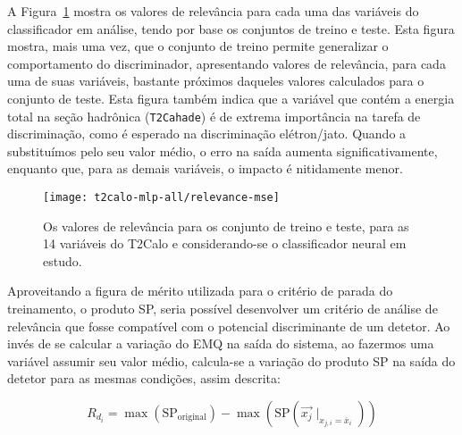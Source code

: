 A Figura~\ref{fig:t2calo-mlp-all-relevance} mostra os valores de relevância
para cada uma das variáveis do classificador em análise, tendo por base os
conjuntos de treino e teste. Esta figura mostra, mais uma vez, que o conjunto
de treino permite generalizar o comportamento do discriminador, apresentando
valores de relevância, para cada uma de suas variáveis, bastante próximos
daqueles valores calculados para o conjunto de teste. Esta figura também
indica que a variável que contém a energia total na seção hadrônica
(\texttt{T2Cahade}) é de extrema importância na tarefa de discriminação, como
é esperado na discriminação elétron/jato. Quando a substituímos pelo seu valor
médio, o erro na saída aumenta significativamente, enquanto que, para as
demais variáveis, o impacto é nitidamente menor.

\begin{figure}
\begin{center}
\texttt{[image: t2calo-mlp-all/relevance-mse]}
\end{center}
\caption{Os valores de relevância para os conjunto de treino e
teste, para as 14 variáveis do T2Calo e considerando-se o classificador neural
em estudo.}
\label{fig:t2calo-mlp-all-relevance}
\end{figure}

Aproveitando a figura de mérito utilizada para o critério de parada do
treinamento, o produto SP, seria possível desenvolver um critério de análise
de relevância que fosse compatível com o potencial discriminante de um
detetor. Ao invés de se calcular a variação do EMQ na saída do sistema, ao
fazermos uma variável assumir seu valor médio, calcula-se a variação do
produto SP na saída do detetor para as mesmas condições, assim descrita:

\begin{equation}
R_{d_i} = \max(\text{SP}_{\text{original}}) - \max(\text{SP}(\overrightarrow{x_j}\mid_{x_{j,i} = \overline{x}_i}))
\label{eq:relevance-sp}
\end{equation}


